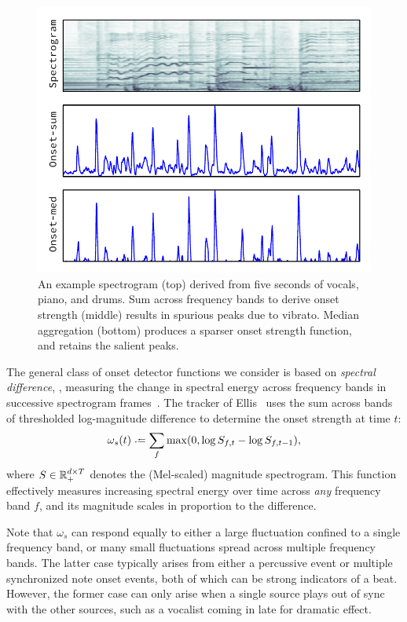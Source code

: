 \documentclass{article}
\begin{document}
\begin{figure}
\centering%
\includegraphics[width=\columnwidth]{figs/onsets}%
\vspace{-\baselineskip}
\caption{An example spectrogram (top) derived from five seconds of vocals, piano, and drums.  
Sum across frequency bands to derive onset strength (middle) results in spurious peaks due to vibrato.
Median aggregation (bottom) produces a sparser onset strength function, and retains the salient peaks.}
\label{fig:onsets}
\end{figure}

The general class of onset detector functions we consider is based on \emph{spectral 
difference}, \ie, measuring the change in spectral energy across frequency bands in 
successive spectrogram frames~\cite{bello2005tutorial}. The tracker 
of Ellis~\cite{ellis2007beat} uses the sum across bands of thresholded log-magnitude
difference to determine the onset strength at time $t$:
\begin{equation}
\omega_s(t) \defeq \sum_f \max(0, \log S_{f, t} - \log S_{f, t-1}),\label{eq:onset:sum}
\end{equation}
where $S \in \mathbb{R}_+^{d\times T}$ denotes the (Mel-scaled) magnitude spectrogram.  
This function effectively measures increasing spectral energy over time across 
\emph{any} frequency band $f$, and its magnitude scales in proportion to the 
difference.

Note that $\omega_s$ can respond equally to either a large fluctuation confined to a 
single frequency band, or many small fluctuations spread across multiple frequency bands.
The latter case typically arises from either a percussive event or multiple synchronized 
note onset events, both of which can be strong indicators of a beat.  However, the former 
case can only arise when a single source plays out of sync with the other sources, such 
as a vocalist coming in late for dramatic effect.
\end{document}
